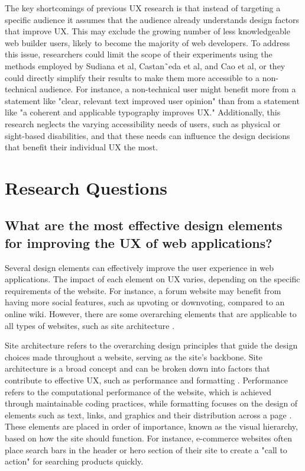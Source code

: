 \documentclass[article]{IEEEtran}
\begin{document}
        The key shortcomings of previous UX research is that instead of targeting a specific audience it assumes that the audience already understands design factors that improve UX. This may exclude the growing number of less knowledgeable web builder users, likely to become the majority of web developers. To address this issue, researchers could limit the scope of their experiments using the methods employed by Sudiana et al, Castan˜eda et al, and Cao et al, \cite{sudiana, castan, cao} or they could directly simplify their results to make them more accessible to a non-technical audience. For instance, a non-technical user might benefit more from a statement like "clear, relevant text improved user opinion" than from a statement like "a coherent and applicable typography improves UX." Additionally, this research neglects the varying accessibility needs of users, such as physical or sight-based disabilities, and that these needs can influence the design decisions that benefit their individual UX the most.

        \section{Research Questions}
            \subsection{What are the most effective design elements for improving the UX of web applications?}
                Several design elements can effectively improve the user experience in web applications. The impact of each element on UX varies, depending on the specific requirements of the website. For instance, a forum website may benefit from having more social features, such as upvoting or downvoting, compared to an online wiki. However, there are some overarching elements that are applicable to all types of websites, such as site architecture \cite{ivory}.
    
                Site architecture refers to the overarching design principles that guide the design choices made throughout a website, serving as the site's backbone. Site architecture is a broad concept and can be broken down into factors that contribute to effective UX, such as performance and formatting \cite{ivory}. Performance refers to the computational performance of the website, which is achieved through maintainable coding practices, while formatting focuses on the design of elements such as text, links, and graphics and their distribution across a page \cite{ivory}. These elements are placed in order of importance, known as the visual hierarchy, based on how the site should function. For instance, e-commerce websites often place search bars in the header or hero section of their site to create a "call to action" for searching products quickly.
                
\end{document}
